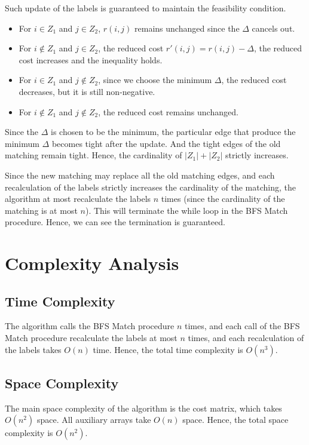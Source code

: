 \documentclass[a4paper,12pt]{article}
\begin{document}
Such update of the labels is guaranteed to maintain the feasibility condition.
\begin{itemize}
	\item For $i \in Z_1$ and $j \in Z_2$, $r(i, j)$ remains unchanged since the $\Delta$ cancels out.
	\item For $i \not\in Z_1$ and $j \in Z_2$, the reduced cost $r'(i, j) = r(i, j) - \Delta$, the reduced cost increases and the inequality holds.
	\item For $i \in Z_1$ and $j \not\in Z_2$, since we choose the minimum $\Delta$, the reduced cost decreases, but it is still non-negative.
	\item For $i \not\in Z_1$ and $j \not\in Z_2$, the reduced cost remains unchanged.
\end{itemize}

Since the $\Delta$ is chosen to be the minimum, the particular edge that produce the minimum $\Delta$ becomes tight after the update.
And the tight edges of the old matching remain tight.
Hence, the cardinality of $|Z_1| + |Z_2|$ strictly increases.

Since the new matching may replace all the old matching edges, and each recalculation of the labels strictly increases the cardinality of the matching, the algorithm at most recalculate the labels $n$ times (since the cardinality of the matching is at most $n$).
This will terminate the while loop in the BFS Match procedure.
Hence, we can see the termination is guaranteed.

\section{Complexity Analysis}

\subsection{Time Complexity}

The algorithm calls the BFS Match procedure $n$ times, and each call of the BFS Match procedure recalculate the labels at most $n$ times, and each recalculation of the labels takes $O(n)$ time.
Hence, the total time complexity is $O(n^3)$.

\subsection{Space Complexity}

The main space complexity of the algorithm is the cost matrix, which takes $O(n^2)$ space.
All auxiliary arrays take $O(n)$ space.
Hence, the total space complexity is $O(n^2)$.
\end{document}
